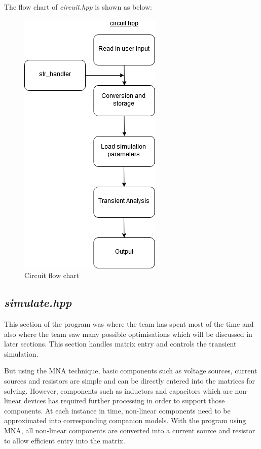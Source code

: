 \documentclass[12pt,a4paper]{article}
\begin{document}
	The flow chart of \textit{circuit.hpp} is shown as below: \par
	\begin{figure} [h!]
		\centering
		\includegraphics[scale=0.5]{circuit.PNG}
		\caption{Circuit flow chart}
	\end{figure}
	\pagebreak
	\subsection{\textit{simulate.hpp}}
	This section of the program was where the team has spent most of the time and also where the
	team saw many possible optimisations which will be discussed in later sections. This 
	section handles matrix entry and controls the transient simulation. \par
	But using the MNA technique, basic components such as voltage sources, current 
	sources and resistors are simple and can be directly entered into the matrices for 
	solving. However, components such as inductors and capacitors which are non-linear
	devices has required further processing in order to support those components. 
	At each instance in time, non-linear components need to be approximated into corresponding
	companion models. With the program using MNA, all non-linear components are converted 
	into a current source and resistor to allow efficient entry into the matrix.
\end{document}

